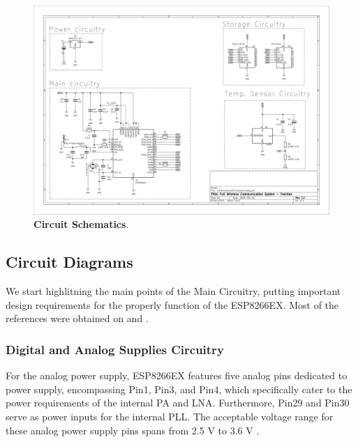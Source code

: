 \begin{landscape}

\begin{figure}[H]
    \centering
    \includegraphics[scale = 0.775]{imagens/schematics-1.png}
    \caption{\textbf{Circuit Schematics}.}
    \label{02fig:schematics-1}
\end{figure}



\end{landscape}


\subsection{Circuit Diagrams}\label{02Sub:CircuitDiagrams}

We start highlitning the main points of the Main Circuitry, putting important
design requirements for the properly function of the ESP8266EX. Most of the references 
were obtained on \cite{ESP8266EX} and \cite{ESP8266HGL}.

\subsubsection{Digital and Analog Supplies Circuitry}\label{02SubSub:DigitalAndAnalogSuppliesCircuitry}

For the analog power supply, ESP8266EX features five analog pins dedicated to power supply, encompassing Pin1, Pin3, and Pin4, 
which specifically cater to the power requirements of the internal PA and LNA. Furthermore, Pin29 and Pin30 serve as power inputs for the internal PLL. 
The acceptable voltage range for these analog power supply pins spans from 2.5 V to 3.6 V \cite{ESP8266HGL}.  \\ 

